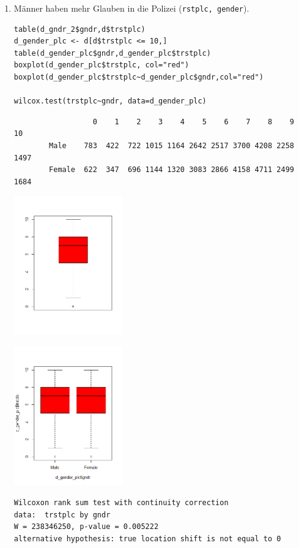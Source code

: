 \documentclass{article}
\begin{document}
\begin{enumerate}
	\item Männer haben mehr Glauben in die Polizei (\texttt{rstplc, gender}).
	\begin{lstlisting}
table(d_gndr_2$gndr,d$trstplc)
d_gender_plc <- d[d$trstplc <= 10,]
table(d_gender_plc$gndr,d_gender_plc$trstplc)
boxplot(d_gender_plc$trstplc, col="red")
boxplot(d_gender_plc$trstplc~d_gender_plc$gndr,col="red")

wilcox.test(trstplc~gndr, data=d_gender_plc)
	\end{lstlisting}
	\begin{lstlisting}
		          0    1    2    3    4    5    6    7    8    9   10
		Male    783  422  722 1015 1164 2642 2517 3700 4208 2258 1497
		Female  622  347  696 1144 1320 3083 2866 4158 4711 2499 1684
	\end{lstlisting}
\begin{minipage}{0.42\textwidth}
	\includegraphics[height=6cm]{./Hypothese1a.png}
\end{minipage}
\begin{minipage}{0.42\textwidth}
	\includegraphics[height=6cm]{./Hypothese1b.png}
\end{minipage}
	\begin{Verbatim}[frame=single]
Wilcoxon rank sum test with continuity correction
data:  trstplc by gndr
W = 238346250, p-value = 0.005222
alternative hypothesis: true location shift is not equal to 0
	\end{Verbatim}


\end{enumerate}
\end{document}
